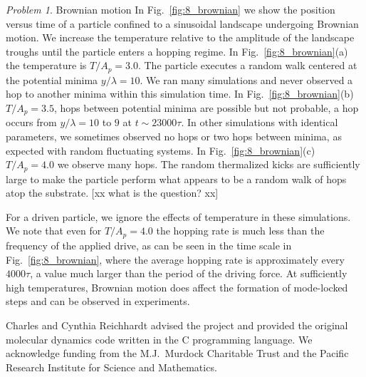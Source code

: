 \documentclass[preprint,showpacs,preprintnumbers,amsmath,amssymb,aps,prb]{revtex4-1}
\theoremstyle{remark}
\newtheorem{problem}{Problem}
\begin{document}
\begin{problem}{Brownian motion}
  In Fig.~\ref{fig:8_brownian}
  we show the position versus time of a particle
  confined to a sinusoidal landscape
  undergoing Brownian motion.
  We increase the temperature relative
  to the amplitude of the landscape
  troughs until the particle enters a hopping regime.
  In  Fig.~\ref{fig:8_brownian}(a)
  the temperature is $T/A_p = 3.0$.
  The particle executes a 
  random walk centered at the potential minima $y/\lambda = 10$.
  We ran many simulations and never observed a hop to another minima
  within this simulation time.  
  In  Fig.~\ref{fig:8_brownian}(b)
  $T/A_p = 3.5$,  hops between
  potential minima are possible but not probable,
  a hop occurs from
  $y/\lambda = 10$ to $9$ at
  $t \sim 23000 \tau$. 
  In other simulations with identical parameters,
  we sometimes observed no hops or two hops between minima,
  as expected with random fluctuating systems.
  In  Fig.~\ref{fig:8_brownian}(c)
  $T/A_p = 4.0$ 
  we observe many hops.
  The random thermalized kicks are
  sufficiently large to make the particle perform
  what appears to be 
  a random walk of hops atop the substrate. [xx what is the question? xx]

  For a driven particle,
  we ignore 
  the effects of temperature 
  in these simulations.  
  We note that even for $T/A_p = 4.0$ 
  the hopping rate
  is much less than the
  frequency of the applied drive, as
 can be seen in the time scale in Fig.~\ref{fig:8_brownian},
  where the average hopping rate is approximately
  every $4000\tau$,
  a value much larger than the period of the driving force.  
  At sufficiently high temperatures,
  Brownian motion does affect 
  the formation of mode-locked steps
  and can be observed in experiments.
\end{problem}

\begin{acknowledgments}

  Charles and Cynthia Reichhardt advised 
  the project and provided the original molecular dynamics code
  written in the C programming language.
  We acknowledge funding from the M.J.\ Murdock Charitable Trust
  and the Pacific Research Institute for Science and Mathematics. %

\end{acknowledgments}
\end{document}
